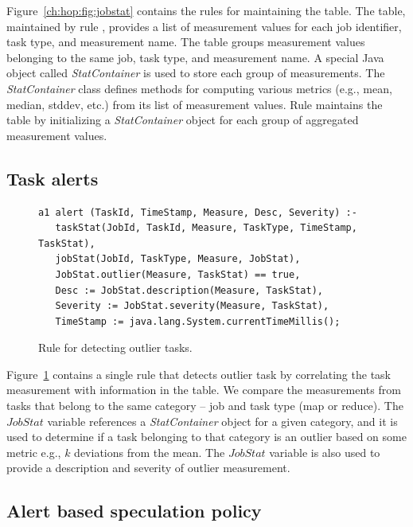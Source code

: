 Figure~\ref{ch:hop:fig:jobstat} contains the rules for maintaining the
 table.  The  table, maintained by rule ,
provides a list of measurement values for each job identifier, task type, and
measurement name.  The  table groups measurement values belonging
to the same job, task type, and measurement name.  A special Java object called
{\em StatContainer} is used to store each group of measurements.  The {\em
StatContainer} class defines methods for computing various metrics (e.g., mean,
median, stddev, etc.) from its list of measurement values.  Rule 
maintains the  table by initializing a {\em StatContainer} object
for each group of aggregated measurement values.


\subsection{Task alerts} 

\begin{figure}
\ssp
\centering
\begin{lstlisting}
a1 alert (TaskId, TimeStamp, Measure, Desc, Severity) :-
   taskStat(JobId, TaskId, Measure, TaskType, TimeStamp, TaskStat),
   jobStat(JobId, TaskType, Measure, JobStat),
   JobStat.outlier(Measure, TaskStat) == true,
   Desc := JobStat.description(Measure, TaskStat),
   Severity := JobStat.severity(Measure, TaskStat),
   TimeStamp := java.lang.System.currentTimeMillis();
\end{lstlisting}
\caption{\label{ch:hop:fig:outlier} Rule for detecting outlier tasks. }
\end{figure}

Figure~\ref{ch:hop:fig:outlier} contains a single rule that detects outlier
task by correlating the task measurement with information in the 
table.  We compare the measurements from tasks that belong to the same category
-- job and task type (map or reduce).  The $JobStat$ variable references a {\em
StatContainer} object for a given category, and it is used to determine if a
task belonging to that category is an outlier based on some metric e.g., $k$
deviations from the mean.  The $JobStat$ variable is also used to provide a
description and severity of outlier measurement.

\subsection{Alert based speculation policy} 
\label{ch:hop:sec:speculation}

